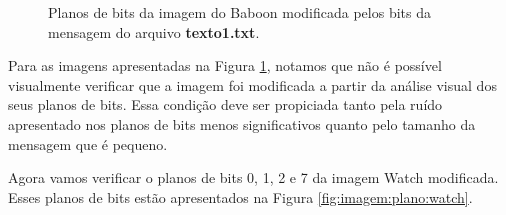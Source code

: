 \documentclass{article}
\begin{document}
\begin{figure}[htp]
	\qquad
	\qquad

	\caption{Planos de bits da imagem do Baboon modificada pelos bits da mensagem do arquivo \textbf{texto1.txt}.}%
	\label{fig:imagem:plano:baboon}%
\end{figure}	


Para as imagens apresentadas na Figura \ref{fig:imagem:plano:baboon}, notamos que não é possível visualmente verificar que a imagem foi modificada a partir da análise visual dos seus planos de bits. Essa condição deve ser propiciada tanto pela ruído apresentado nos planos de bits menos significativos quanto pelo tamanho da mensagem que é pequeno. 

\newpage
Agora vamos verificar o planos de bits 0, 1, 2 e 7 da imagem Watch modificada. Esses planos de bits estão apresentados na Figura \ref{fig:imagem:plano:watch}. 
\end{document}
